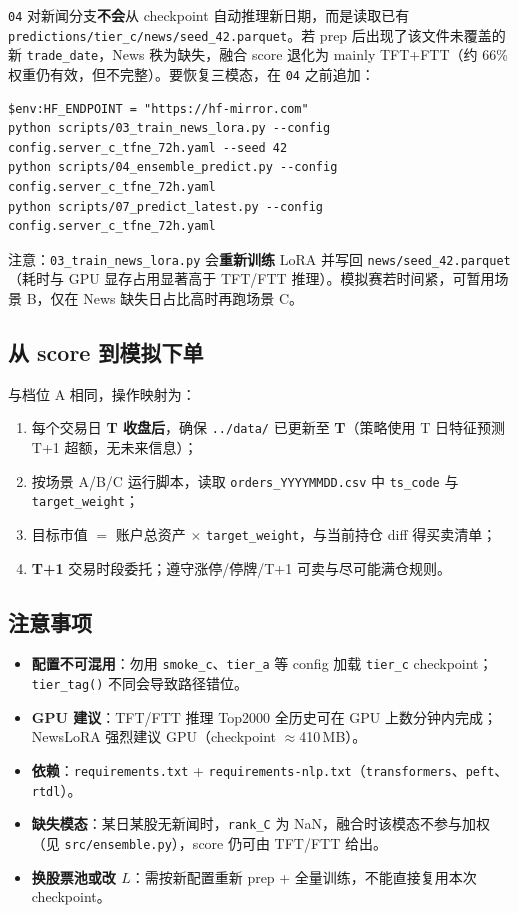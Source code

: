 \documentclass[UTF8,a4paper,12pt]{ctexart}
\begin{document}
\texttt{04} 对新闻分支\textbf{不会}从 checkpoint 自动推理新日期，而是读取已有 \texttt{predictions/tier\_c/news/seed\_42.parquet}。若 prep 后出现了该文件未覆盖的新 \texttt{trade\_date}，News 秩为缺失，融合 score 退化为 mainly TFT+FTT（约 66\% 权重仍有效，但不完整）。要恢复三模态，在 \texttt{04} 之前追加：

\begin{verbatim}
$env:HF_ENDPOINT = "https://hf-mirror.com"
python scripts/03_train_news_lora.py --config config.server_c_tfne_72h.yaml --seed 42
python scripts/04_ensemble_predict.py --config config.server_c_tfne_72h.yaml
python scripts/07_predict_latest.py --config config.server_c_tfne_72h.yaml
\end{verbatim}

注意：\texttt{03\_train\_news\_lora.py} 会\textbf{重新训练} LoRA 并写回 \texttt{news/seed\_42.parquet}（耗时与 GPU 显存占用显著高于 TFT/FTT 推理）。模拟赛若时间紧，可暂用场景 B，仅在 News 缺失日占比高时再跑场景 C。

\subsection{从 score 到模拟下单}

与档位 A 相同，操作映射为：
\begin{enumerate}[leftmargin=2em]
  \item 每个交易日 \textbf{T 收盘后}，确保 \texttt{../data/} 已更新至 \textbf{T}（策略使用 T 日特征预测 T+1 超额，无未来信息）；
  \item 按场景 A/B/C 运行脚本，读取 \texttt{orders\_YYYYMMDD.csv} 中 \texttt{ts\_code} 与 \texttt{target\_weight}；
  \item 目标市值 $=$ 账户总资产 $\times$ \texttt{target\_weight}，与当前持仓 diff 得买卖清单；
  \item \textbf{T+1} 交易时段委托；遵守涨停/停牌/T+1 可卖与尽可能满仓规则。
\end{enumerate}

\subsection{注意事项}

\begin{itemize}[leftmargin=2em]
  \item \textbf{配置不可混用}：勿用 \texttt{smoke\_c}、\texttt{tier\_a} 等 config 加载 \texttt{tier\_c} checkpoint；\texttt{tier\_tag()} 不同会导致路径错位。
  \item \textbf{GPU 建议}：TFT/FTT 推理 Top2000 全历史可在 GPU 上数分钟内完成；NewsLoRA 强烈建议 GPU（checkpoint $\approx$410\,MB）。
  \item \textbf{依赖}：\texttt{requirements.txt} + \texttt{requirements-nlp.txt}（\texttt{transformers}、\texttt{peft}、\texttt{rtdl}）。
  \item \textbf{缺失模态}：某日某股无新闻时，\texttt{rank\_C} 为 NaN，融合时该模态不参与加权（见 \texttt{src/ensemble.py}），score 仍可由 TFT/FTT 给出。
  \item \textbf{换股票池或改 $L$}：需按新配置重新 prep + 全量训练，不能直接复用本次 checkpoint。
\end{itemize}
\end{document}
